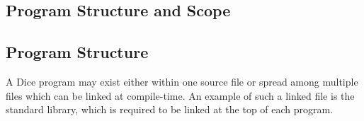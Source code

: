 \begin{homeworkProblem}
	\chapter{Program Structure and Scope}
	\section{Program Structure}
		
		A Dice program may exist either within one source file or spread among multiple files which can be linked at compile-time. An example of such a linked file is the standard library, which is required to be linked at the top of each program.
		
\end{homeworkProblem}